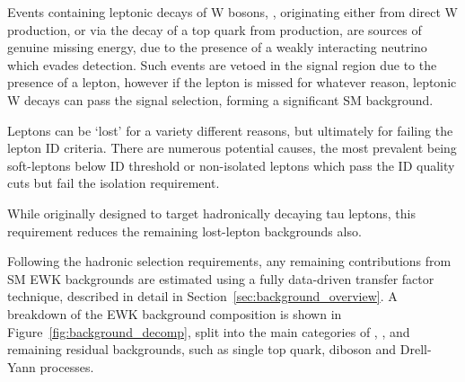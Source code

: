 Events containing leptonic decays of W bosons, \wlnu, originating either
from direct W production, or via the decay of a top quark from \ttbar 
production, are sources of genuine 
missing energy, due to the presence of a weakly interacting neutrino which
evades detection. Such events are vetoed in the signal
region due to the presence of a 
lepton, however if the lepton is missed for whatever reason, leptonic W decays 
can pass the signal selection, forming a significant SM background.


Leptons can be `lost' for a variety different reasons, but ultimately for failing
the lepton ID criteria. There are numerous potential causes, the 
most prevalent being soft-leptons below ID threshold or non-isolated leptons 
which pass the ID quality cuts but fail the isolation requirement.



While originally designed to target hadronically decaying tau leptons, 
this requirement reduces the remaining lost-lepton backgrounds also.

Following the hadronic selection requirements,
any remaining contributions from SM EWK backgrounds are estimated using a 
fully data-driven transfer factor technique, described in detail in
Section~\ref{sec:background_overview}. A breakdown of the EWK background 
composition is shown in Figure~\ref{fig:background_decomp}, split into the main 
categories of \zinv, \wj, \ttbar and remaining residual backgrounds, such as
single top quark, diboson and Drell-Yann processes.

